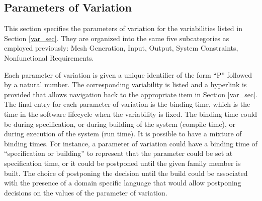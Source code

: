 \documentclass[12pt, notitlepage]{article}
\begin{document}
\subsection{Parameters of Variation}
This section specifies the parameters of variation for the variabilities listed in Section \ref{var_sec}. They are organized into the same five subcategories as employed previously: Mesh Generation, Input, Output, System Constraints, Nonfunctional Requirements. 

Each parameter of variation is given a unique identifier of the form “P” followed by a natural number. The corresponding variability is listed and a hyperlink is provided that allows navigation back to the appropriate item in Section \ref{var_sec}. The final entry for each parameter of variation is the binding time, which is the time in the software lifecycle when the variability is fixed. The binding time could be during specification, or during building
of the system (compile time), or during execution of the system (run time). It is possible to have a mixture of binding times. For instance, a parameter of variation could have a binding time of “specification or building” to represent that the parameter could be set at specification time, or it could be postponed until the given family member is built. The choice of postponing the decision until the build could be associated with the presence of a domain specific language that would allow postponing decisions on the values of the parameter of variation.
\end{document}
